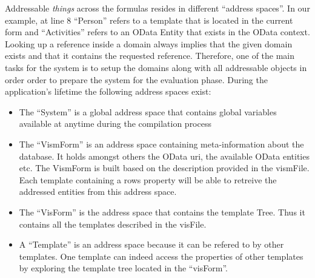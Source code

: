 Addressable \emph{things} across the formulas resides in different ``address spaces''. In our example, at line 8 ``Person'' refers to a template that is located in the current form and ``Activities'' refers to an OData Entity that exists in the OData context. Looking up a reference inside a domain always implies that the given domain exists and that it contains the requested reference. Therefore, one of the main tasks for the system is to setup the domains along with all addressable objects in order order to prepare the system for the evaluation phase. During the application's lifetime the following address spaces exist:
\begin{itemize}
    \item The ``System'' is a global address space that contains global variables available at anytime during the compilation process
    \item The ``VismForm'' is an address space containing meta-information about the database. It holds amongst others the OData uri, the available OData entities etc. The VismForm is built based on the description provided in the vismFile. Each template containing a rows property will be able to retreive the addressed entities from this address space. 
    \item The ``VisForm'' is the address space that contains the template Tree. Thus it contains all the templates described in the visFile.
    \item A ``Template'' is an address space because it can be refered to by other templates. One template can indeed access the properties of other templates by exploring the template tree located in the ``visForm''.
\end{itemize}

